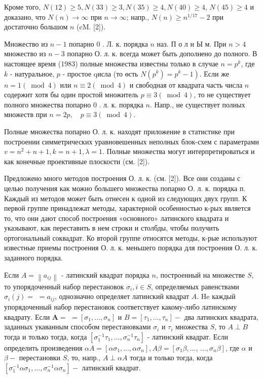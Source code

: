 \documentclass[10pt]{article}
\begin{document}
Кроме того, $N(12) \geqslant 5, N(33) \geqslant 3, N(35) \geqslant 4, N(40) \geqslant 4$, $N(45) \geqslant 4$ и доказано, что $N(n) \rightarrow \infty$ при $n \rightarrow \infty$; напр., $N(n) \geqslant n^{1 / 17}-2$ при достаточно большом $n$ (cM. [2]).



Множество из $n-1$ попарно 0 . Л. к. порядка $n$ наз. П о л н Ы м. При $n>4$ множество из $n-3$ попарно О. л. к. всегда может быть дополнено до полного. В настоящее время (1983) полные множества известны только в случае $n=p^{k}$, где $k$ - натуральное, $p$ - простое qисла (то өсть $\left.N\left(p^{k}\right)=p^{k}-1\right)$. Если же $n=1(\bmod 4)$ или $n \equiv 2(\bmod 4)$ и свободная от квадрата часть числа $n$ содержит хотя бы один простой множитель $p \equiv 3(\bmod 4)$, то не существует полного множества попарно 0 . л. к. порядка $n$. Напр., не существует полных множеств при $n=2 p, \quad p \equiv 3(\bmod 4)$.



Полные множества попарно О. л. к. находят приложение в статистике при построении симметрических уравновешенных неполных блок-схем с параметрами $v=n^{2}+n+1, k=n+1, \lambda=1$. Полные множества могут интерпретироваться и как конечные проективные плоскости (см. [2]).



Предложено много методов построения О. л. к. (см. [2]). Все они созданы с целью получения как можно большего множества попарно О. л. к. порядка п. Каждый из методов может быть отнесен к одной из следующих двух групп. К первой группе принадлежат методы, характерной особенностью к-рых является то, что они дают способ построения «основного» латинского квадрата и указывают, как переставить в нем строки и столбды, чтобы получить ортогональный соквадрат. Ко второй группе относятся методы, к-рые используют известные приемы построения О. л. к. меньшего порядка для построения О. л. к. заданного порядка.



Если $A=\left\|a_{i j}\right\|$ - латинский квадрат порядка $n$, построенный на множестве $S$, то упорядоченный набор перестановок $\sigma_{i}, i \in S$, определяемых равенствами $\sigma_{i}(j)=$ $=a_{i j}$, однозначно определяет латинский квадрат $A$. He каждый упорядоченный набор перестановок соответствует какому-либо латинскому квадрату. Если $\boldsymbol{A}=$ $=\left[\sigma_{1}, \ldots, \sigma_{n}\right]$ и $B=\left[\tau_{1}, \ldots, \tau_{n}\right]-$ два латинских квадрата, заданных укаванным способом перестановками $\sigma_{i}$ и $\tau_{i}$ множества $S$, то $A \perp B$ тогда и только тогда, когда $\left[\sigma_{1}^{-1} \tau_{1}, \ldots, \sigma_{n}^{-1} \tau_{n}\right]$ - латинский квадрат. Если определить произведения $\alpha A=\left[\alpha \sigma_{1}, \ldots, \alpha \sigma_{n}\right], A \beta=\left[\sigma_{1} \beta, \ldots\right.$, $\left.\ldots, \sigma_{n} \beta\right]$, где $\alpha$ и $\beta-$ перестановки $S$, то, напр., $A \perp \alpha A$ тогда и только тогда, когда $\left[\sigma_{1}^{-1} \alpha \sigma_{1}, \ldots, \sigma_{n}^{-1} \alpha \sigma_{n}\right]-$ латинский квадрат.
\end{document}
